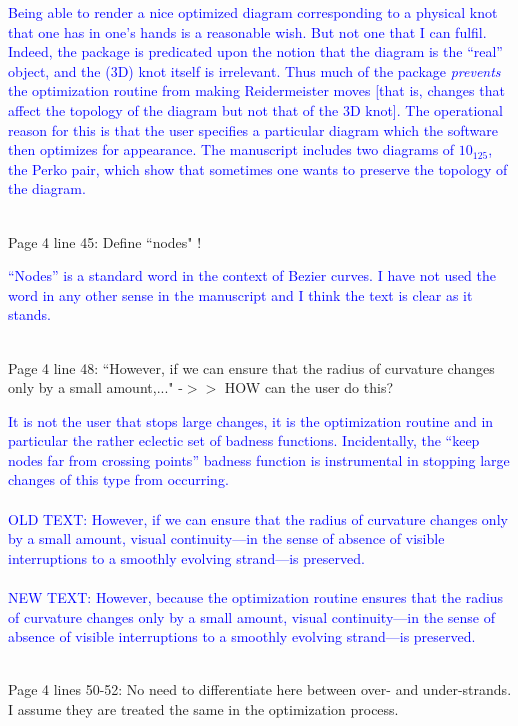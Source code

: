 \documentclass[12pt]{article}
\begin{document}
\textcolor{blue}{Being able to render a nice optimized diagram
  corresponding to a physical knot that one has in one's hands is a
  reasonable wish.  But not one that I can fulfil.  Indeed, the
  package is predicated upon the notion that the diagram is the
  ``real'' object, and the (3D) knot itself is irrelevant.  Thus much
  of the package {\em prevents} the optimization routine from making
  Reidermeister moves [that is, changes that affect the topology of
    the diagram but not that of the 3D knot].  The operational reason
  for this is that the user specifies a particular diagram which the
  software then optimizes for appearance.  The manuscript includes two
  diagrams of $10_{125}$, the Perko pair, which show that sometimes
  one wants to preserve the topology of the diagram.\\ \\}
  
Page 4 line 45: Define ``nodes" !

\textcolor{blue}{``Nodes'' is a standard word in the context of Bezier
  curves. I have not used the word in any other sense in the
  manuscript and I think the text is clear as it stands.\\ \\}

Page 4 line 48: ``However, if we can ensure that the radius of
curvature changes only by a small amount,..."  -$>>$ HOW can the user do
this?

\textcolor{blue}{It is not the user that stops large changes, it is
  the optimization routine and in particular the rather eclectic set
  of badness functions.  Incidentally, the ``keep nodes far from
  crossing points'' badness function is instrumental in stopping large
  changes of this type from occurring.\\ \\ OLD TEXT: However, if we
  can ensure that the radius of curvature changes only by a small
  amount, visual continuity---in the sense of absence of visible
  interruptions to a smoothly evolving strand---is
  preserved. \\ \\ NEW TEXT: However, because the optimization routine
  ensures that the radius of curvature changes only by a small
  amount, visual continuity---in the sense of absence of visible
  interruptions to a smoothly evolving strand---is
  preserved.\\ \\
}

Page 4 lines 50-52: No need to differentiate here between over- and
under-strands.  I assume they are treated the same in the optimization
process.
\end{document}

